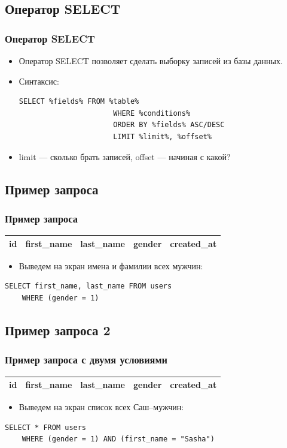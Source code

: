 \documentclass[compress,red]{beamer}
\begin{document}
\subsection{Оператор SELECT}
\begin{frame}[fragile]
  \frametitle{Оператор SELECT}
  \begin{itemize}
    \item Оператор SELECT позволяет сделать выборку записей из базы данных.
    \item Синтаксис:
    \scriptsize{
    \begin{lstlisting}[label=sql1,caption=Синтаксис SELECT]
      SELECT %fields% FROM %table%
                      WHERE %conditions%
                      ORDER BY %fields% ASC/DESC
                      LIMIT %limit%, %offset%
    \end{lstlisting}
    }
    \item limit --- сколько брать записей, offset --- начиная с какой?
  \end{itemize}
\end{frame}

\subsection{Пример запроса}
\begin{frame}[fragile]
  \frametitle{Пример запроса}
  \begin{tabular}{|c|c|c|c|c|}
  \hline
  id & first\_name & last\_name & gender & created\_at\\
  \hline
  \end{tabular}
  \begin{itemize}
    \item Выведем на экран имена и фамилии всех мужчин:
  \end{itemize}
  \scriptsize{
  \begin{lstlisting}[label=sql2,caption=SELECT]
    SELECT first_name, last_name FROM users
    WHERE (gender = 1)
  \end{lstlisting}
  }
\end{frame}

\subsection{Пример запроса 2}
\begin{frame}[fragile]
  \frametitle{Пример запроса с двумя условиями}
  \begin{tabular}{|c|c|c|c|c|}
  \hline
  id & first\_name & last\_name & gender & created\_at\\
  \hline
  \end{tabular}
  \begin{itemize}
    \item Выведем на экран список всех Саш--мужчин:
  \end{itemize}
  \scriptsize{
  \begin{lstlisting}[label=sql3,caption=SELECT]
    SELECT * FROM users
    WHERE (gender = 1) AND (first_name = "Sasha")
  \end{lstlisting}
  }
\end{frame}
\end{document}
